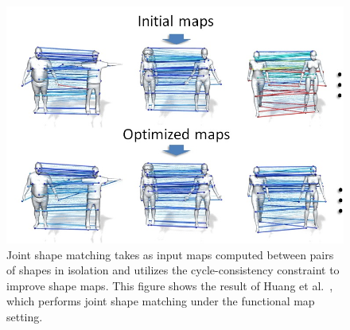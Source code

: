 \begin{figure}[t]
\centering
    \includegraphics[width=1.0\columnwidth]{fig/img/huang_sig14_jsm.png}
    \caption{Joint shape matching takes as input maps computed between pairs of shapes in isolation and utilizes the cycle-consistency constraint to improve shape maps. This figure shows the result of Huang et al.~\cite{Huang:2014:FMN}, which performs joint shape matching under the functional map setting.}
    \label{fig:huang_sig14_jsm}
\end{figure}

